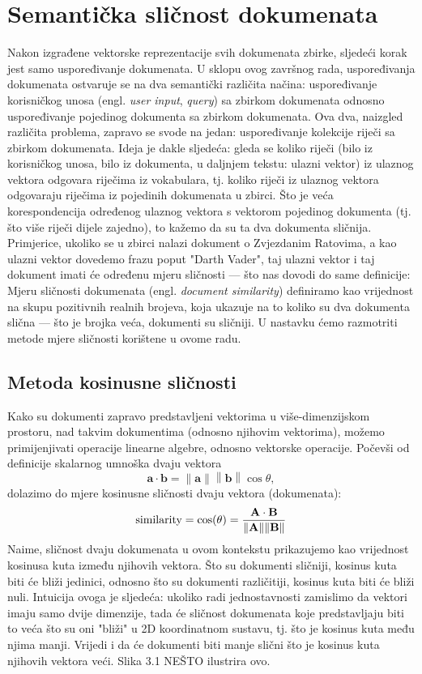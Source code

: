 \documentclass[times, utf8, zavrsni]{fer}
\begin{document}
\section{Semantička sličnost dokumenata}
Nakon izgrađene vektorske reprezentacije svih dokumenata zbirke, sljedeći korak jest samo uspoređivanje dokumenata. U sklopu ovog završnog rada, uspoređivanja dokumenata ostvaruje se na dva semantički različita načina: uspoređivanje korisničkog unosa (engl. \textit{user input}, \textit{query}) sa zbirkom dokumenata odnosno uspoređivanje pojedinog dokumenta sa zbirkom dokumenata.
Ova dva, naizgled različita problema, zapravo se svode na jedan: uspoređivanje kolekcije riječi sa zbirkom dokumenata. Ideja je dakle sljedeća: gleda se koliko riječi (bilo iz korisničkog unosa, bilo iz dokumenta, u daljnjem tekstu: ulazni vektor) iz ulaznog vektora odgovara riječima iz vokabulara, tj. koliko riječi iz ulaznog vektora odgovaraju riječima iz pojedinih dokumenata u zbirci. Što je veća korespondencija određenog ulaznog vektora s vektorom pojedinog dokumenta (tj. što više riječi dijele zajedno), to kažemo da su ta dva dokumenta sličnija. Primjerice, ukoliko se u zbirci nalazi dokument o Zvjezdanim Ratovima, a kao ulazni vektor dovedemo frazu poput "Darth Vader", taj ulazni vektor i taj dokument imati će određenu mjeru sličnosti — što nas dovodi do same definicije:
\newline
Mjeru sličnosti dokumenata (engl. \textit{document similarity}) definiramo kao vrijednost na skupu pozitivnih realnih brojeva, koja ukazuje na to koliko su dva dokumenta slična — što je brojka veća, dokumenti su sličniji.
U nastavku ćemo razmotriti metode mjere sličnosti korištene u ovome radu.

\subsection{Metoda kosinusne sličnosti}
Kako su dokumenti zapravo predstavljeni vektorima u više-dimenzijskom prostoru, nad takvim dokumentima (odnosno njihovim vektorima), možemo primijenjivati operacije linearne algebre, odnosno vektorske operacije. Počevši od definicije skalarnog umnoška dvaju vektora
\begin{equation}
\mathbf {a} \cdot \mathbf {b} =\left\|\mathbf {a} \right\|\left\|\mathbf {b} \right\|\cos \theta,
\end{equation}
dolazimo do mjere kosinusne sličnosti dvaju vektora (dokumenata):
\begin{equation}
{\text{similarity}}=\cos(\theta )={\mathbf {A} \cdot \mathbf {B}  \over \|\mathbf {A} \|\|\mathbf {B}\|}
\end{equation}
Naime, sličnost dvaju dokumenata u ovom kontekstu prikazujemo kao vrijednost kosinusa kuta između njihovih vektora. Što su dokumenti sličniji, kosinus kuta biti će bliži jedinici, odnosno što su dokumenti različitiji, kosinus kuta biti će bliži nuli. Intuicija ovoga je sljedeća: ukoliko radi jednostavnosti zamislimo da vektori imaju samo dvije dimenzije, tada će sličnost dokumenata koje predstavljaju biti to veća što su oni "bliži" u 2D koordinatnom sustavu, tj. što je kosinus kuta među njima manji. Vrijedi i da će dokumenti biti manje slični što je kosinus kuta njihovih vektora veći. Slika 3.1 NEŠTO ilustrira ovo.
\end{document}
